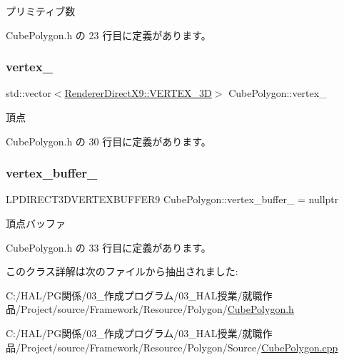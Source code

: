 プリミティブ数 



 Cube\+Polygon.\+h の 23 行目に定義があります。

\mbox{\label{class_cube_polygon_adef890976f8ff8675aeb1c8a5a56ba7b}} 
\subsubsection{\texorpdfstring{vertex\+\_\+}{vertex\_}}
{\footnotesize\ttfamily std\+::vector$<$\mbox{\hyperlink{class_renderer_direct_x9_1_1_v_e_r_t_e_x__3_d}{Renderer\+Direct\+X9\+::\+V\+E\+R\+T\+E\+X\+\_\+3D}}$>$ Cube\+Polygon\+::vertex\+\_\+\hspace{0.3cm}{\ttfamily [private]}}



頂点 



 Cube\+Polygon.\+h の 30 行目に定義があります。

\mbox{\label{class_cube_polygon_adbb5b6de2c10bfaba0d91569ac81e589}} 
\subsubsection{\texorpdfstring{vertex\+\_\+buffer\+\_\+}{vertex\_buffer\_}}
{\footnotesize\ttfamily L\+P\+D\+I\+R\+E\+C\+T3\+D\+V\+E\+R\+T\+E\+X\+B\+U\+F\+F\+E\+R9 Cube\+Polygon\+::vertex\+\_\+buffer\+\_\+ = nullptr\hspace{0.3cm}{\ttfamily [private]}}



頂点バッファ 



 Cube\+Polygon.\+h の 33 行目に定義があります。



このクラス詳解は次のファイルから抽出されました\+:\begin{DoxyCompactItemize}
\item 
C\+:/\+H\+A\+L/\+P\+G関係/03\+\_\+作成プログラム/03\+\_\+\+H\+A\+L授業/就職作品/\+Project/source/\+Framework/\+Resource/\+Polygon/\mbox{\hyperlink{_cube_polygon_8h}{Cube\+Polygon.\+h}}\item 
C\+:/\+H\+A\+L/\+P\+G関係/03\+\_\+作成プログラム/03\+\_\+\+H\+A\+L授業/就職作品/\+Project/source/\+Framework/\+Resource/\+Polygon/\+Source/\mbox{\hyperlink{_cube_polygon_8cpp}{Cube\+Polygon.\+cpp}}\end{DoxyCompactItemize}
